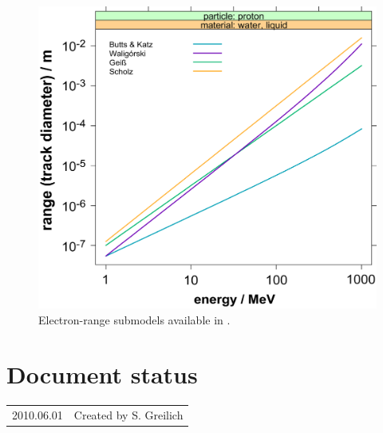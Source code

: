\begin{figure}
	\centering
		\includegraphics[width=1.0\textwidth]{ER.png}
	\caption{Electron-range submodels available in \la{}.}
	\label{fig:ERs}
\end{figure}


\section*{Document status}
\begin{tabular}{l l}
2010.06.01&Created by S. Greilich
\end{tabular}